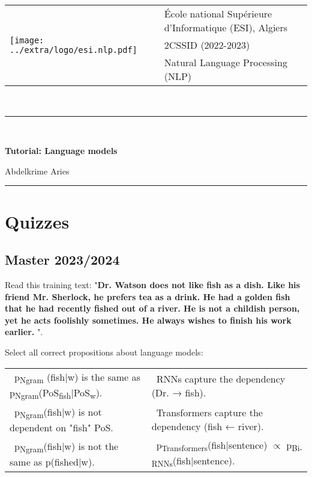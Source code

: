 \documentclass[11pt, a4paper]{article}
\begin{document}
	
	
	\noindent
	\begin{tabular}{ll}
		\multirow{3}{*}{\texttt{[image: ../extra/logo/esi.nlp.pdf]}} & 
		\'Ecole national Supérieure d'Informatique (ESI), Algiers\\
		& 2CSSID (2022-2023)\\
		& Natural Language Processing (NLP)
	\end{tabular}\\[.25cm]
	\noindent\rule{\textwidth}{2pt}\\[-0.5cm]
	\begin{center}
		{\LARGE \textbf{Tutorial: Language models}}
		\begin{flushright}
			Abdelkrime Aries
		\end{flushright}
	\end{center}\vspace{-0.5cm}
	\noindent\rule{\textwidth}{2pt}

\section{Quizzes}

\subsection{Master 2023/2024}

Read this training text: "\textbf{Dr. Watson does not like fish as a dish. Like his friend Mr. Sherlock, he prefers tea as a drink. He had a golden fish that he had recently fished out of a river.  He is not a childish person, yet he acts foolishly sometimes. He always wishes to finish his work earlier. }".

Select all correct propositions about language models:

\begin{longtable}{|p{}p{}|}
	\hline 
	\Square\ p\textsubscript{Ngram} (fish|w) is the same as p\textsubscript{Ngram}(PoS\textsubscript{fish}|PoS\textsubscript{w}). &
	\Square\ RNNs capture the dependency (Dr. → fish).\\
	\Square\ p\textsubscript{Ngram}(fish|w) is not dependent on "fish" PoS. &
	\Square\ Transformers capture the dependency (fish ← river).\\
	\Square\ p\textsubscript{Ngram}(fish|w) is not the same as p(fished|w). &
	\Square\ p\textsubscript{Transformers}(fish|sentence) $ \propto $ p\textsubscript{Bi-RNNs}(fish|sentence).\\
	\hline
\end{longtable}
\end{document}
